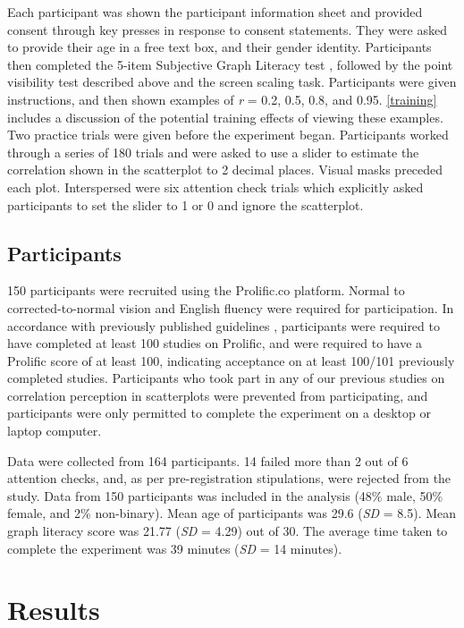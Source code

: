 \documentclass{vgtc}                          %
\begin{document}
Each participant was shown the participant information sheet and provided
consent through key presses in response to consent statements. They were asked
to provide their age in a free text box, and their gender identity. Participants
then completed the 5-item Subjective Graph Literacy test \cite{garcia_2016},
followed by the point visibility test described above and the screen scaling task.
Participants were given instructions, and then shown examples of \emph{r} = 0.2, 0.5, 0.8, and
0.95. \autoref{training} includes a discussion of the potential training effects of
viewing these examples. Two practice trials were given before the experiment began.
Participants worked through a series of 180 trials
and were asked to use a slider to estimate the correlation shown in
the scatterplot to 2 decimal places. Visual masks preceded each plot. Interspersed were six attention
check trials which explicitly asked participants to set the slider to 1 or 0 and ignore the scatterplot.

\hypertarget{participants}{%
\subsection{Participants}\label{participants}}

150 participants were recruited using the Prolific.co platform. Normal to
corrected-to-normal vision and English fluency were required for participation. In
accordance with previously published guidelines \cite{peer_2021},
participants were required to have completed at least 100 studies on Prolific, and were
required to have a Prolific score of at least 100, indicating acceptance on at least
100/101 previously completed studies. Participants who took part in any of our
previous studies on correlation perception in scatterplots
were prevented from participating, and participants were only
permitted to complete the experiment on a desktop or laptop computer.

Data were collected from 164 participants. 14 failed more than 2 out of 6 attention
checks, and, as per pre-registration stipulations, were rejected from the study. Data
from 150 participants was included in the analysis (48\%
male, 50\% female, and 2\%
non-binary). Mean age of participants was 29.6
(\emph{SD} = 8.5). Mean graph literacy score was 21.77
(\emph{SD} = 4.29) out of 30. The average time taken to complete
the experiment was 39 minutes (\emph{SD} = 14 minutes).

\hypertarget{results}{%
\section{Results}\label{results}}
\end{document}
